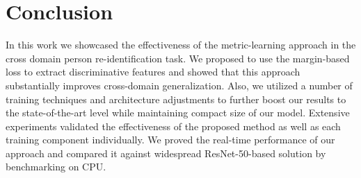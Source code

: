 \documentclass[a4paper,conference]{IEEEtran}
\begin{document}
\section{Conclusion}

In this work we showcased the effectiveness of the metric-learning approach in
the cross domain person re-identification task. We proposed to use the
margin-based loss to extract discriminative features and showed that this
approach substantially improves cross-domain generalization. Also, we utilized a
number of training techniques and architecture adjustments to further boost our
results to the state-of-the-art level while maintaining compact size of our
model. Extensive experiments validated the effectiveness of the proposed method
as well as each training component individually.  We proved the real-time
performance of our approach and compared it against widespread ResNet-50-based
solution by benchmarking on CPU.

































\end{document}
